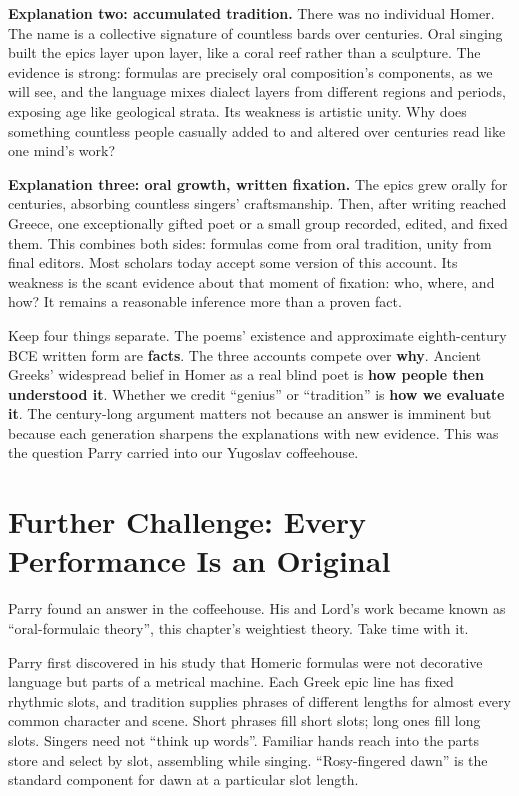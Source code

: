 \textbf{Explanation two: accumulated tradition.} There was no individual Homer. The name is a collective signature of countless bards over centuries. Oral singing built the epics layer upon layer, like a coral reef rather than a sculpture. The evidence is strong: formulas are precisely oral composition's components, as we will see, and the language mixes dialect layers from different regions and periods, exposing age like geological strata. Its weakness is artistic unity. Why does something countless people casually added to and altered over centuries read like one mind's work?

\textbf{Explanation three: oral growth, written fixation.} The epics grew orally for centuries, absorbing countless singers' craftsmanship. Then, after writing reached Greece, one exceptionally gifted poet or a small group recorded, edited, and fixed them. This combines both sides: formulas come from oral tradition, unity from final editors. Most scholars today accept some version of this account. Its weakness is the scant evidence about that moment of fixation: who, where, and how? It remains a reasonable inference more than a proven fact.

Keep four things separate. The poems' existence and approximate eighth-century BCE written form are \textbf{facts}. The three accounts compete over \textbf{why}. Ancient Greeks' widespread belief in Homer as a real blind poet is \textbf{how people then understood it}. Whether we credit ``genius'' or ``tradition'' is \textbf{how we evaluate it}. The century-long argument matters not because an answer is imminent but because each generation sharpens the explanations with new evidence. This was the question Parry carried into our Yugoslav coffeehouse.

\section[Each Performance Is Original]{Further Challenge: Every Performance Is an Original}
Parry found an answer in the coffeehouse. His and Lord's work became known as ``oral-formulaic theory'', this chapter's weightiest theory. Take time with it.

Parry first discovered in his study that Homeric formulas were not decorative language but parts of a metrical machine. Each Greek epic line has fixed rhythmic slots, and tradition supplies phrases of different lengths for almost every common character and scene. Short phrases fill short slots; long ones fill long slots. Singers need not ``think up words''. Familiar hands reach into the parts store and select by slot, assembling while singing. ``Rosy-fingered dawn'' is the standard component for dawn at a particular slot length.

